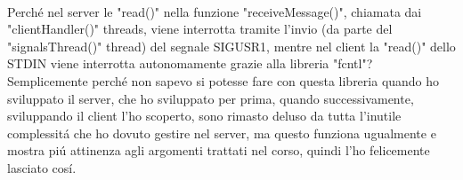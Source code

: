  \\
 Perch\'e nel server le "read()" nella funzione "receiveMessage()", chiamata dai "clientHandler()" threads, viene interrotta tramite l'invio (da parte del "signalsThread()" thread) del segnale SIGUSR1, mentre nel client la "read()" dello STDIN viene interrotta autonomamente grazie alla libreria "fcntl"? Semplicemente perch\'e non sapevo si potesse fare con questa libreria quando ho sviluppato il server, che ho sviluppato per prima, quando successivamente, sviluppando il client l'ho scoperto, sono rimasto deluso da tutta l'inutile complessit\'a che ho dovuto gestire nel server, ma questo funziona ugualmente e mostra pi\'u attinenza agli argomenti trattati nel corso, quindi l'ho felicemente lasciato cos\'i.
 
\iffalse
\begin{figure}[H]
    \centering
    \texttt{[image: immagine.png]}
    \caption{Descrizione.}
\end{figure}
\fi

